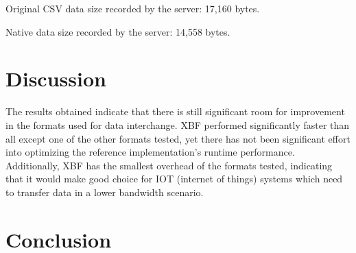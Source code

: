 \documentclass[conference]{IEEEtran}
\begin{document}
Original CSV data size recorded by the server: 17,160 bytes.

Native data size recorded by the server: 14,558 bytes.

\section{Discussion}

The results obtained indicate that there is still significant room for improvement in the formats used for data interchange. XBF performed significantly faster than all except one of the other formats tested, yet there has not been significant effort into optimizing the reference implementation's runtime performance. Additionally, XBF has the smallest overhead of the formats tested, indicating that it would make good choice for IOT (internet of things) systems which need to transfer data in a lower bandwidth scenario.

\section{Conclusion}



\end{document}
